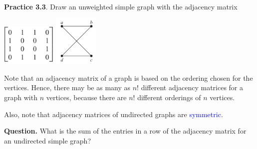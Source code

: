 \documentclass[aspectratio=169]{beamer}
\providecommand{\Blue}[1]{\textcolor{blue}{#1}}
\begin{document}
\begin{frame}[plain]{}

 {\bf Practice 3.3}. Draw an unweighted simple graph with the adjacency matrix
 
  \begin{center}
  \includegraphics[height=2cm]{./img/lecture3-fig4a.png}\hspace{.4in}\pause
   \includegraphics[height=2.4cm]{./img/lecture3-fig4b.png}
 \end{center}
 
 \pause
 
 Note that an adjacency matrix of a  graph is based on the ordering chosen for the vertices.
 Hence, there may be as many as $n!$ different adjacency matrices for a graph with $n$ vertices,
 because there are $n!$ different orderings of $n$ vertices. \medskip
 
 Also, note that adjacency matrices of undirected graphs are \Blue{symmetric}. \pause
 \medskip
 
 {\bf Question.}  What is the sum of the entries in a row of the adjacency
matrix for an undirected simple graph?
 
\end{frame}
\end{document}
